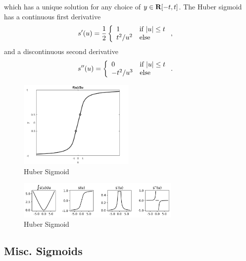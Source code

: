 \documentclass{article}
\begin{document}
    which has a unique solution for any choice of $y\in\textbf{R}[-t,t]$.
    The Huber sigmoid has a continuous first derivative
    \begin{align*}
        s'(u)
        &=\frac{1}{2}
        \left\{\begin{array}{lllllllllllllllllll}1 & \text{if $|u|\leq t$} \\ t^2/u^2 & \text{else}\end{array}\right.,
    \end{align*}
    and a discontinuous second derivative
    \begin{align*}
        s''(u)
        &=\left\{\begin{array}{lllllllllllllllllll}0 & \text{if $|u|\leq t$} \\ -t^2/u^3 & \text{else}\end{array}\right..
    \end{align*}
    \begin{figure}[h!]
        \centering
        \includegraphics[width=0.5\textwidth]{./figs/nn/huber_sigmoid.png}
        \caption{Huber Sigmoid}
        \label{fig:huber_sigmoid}
    \end{figure}
    \begin{figure}[h!]
        \centering
        \includegraphics[width=0.7\textwidth]{./figs/nn/sig/Huber.png}
        \caption{Huber Sigmoid}
        \label{fig:sig_Huber}
    \end{figure}
    \clearpage

\subsection{Misc. Sigmoids}
\end{document}
